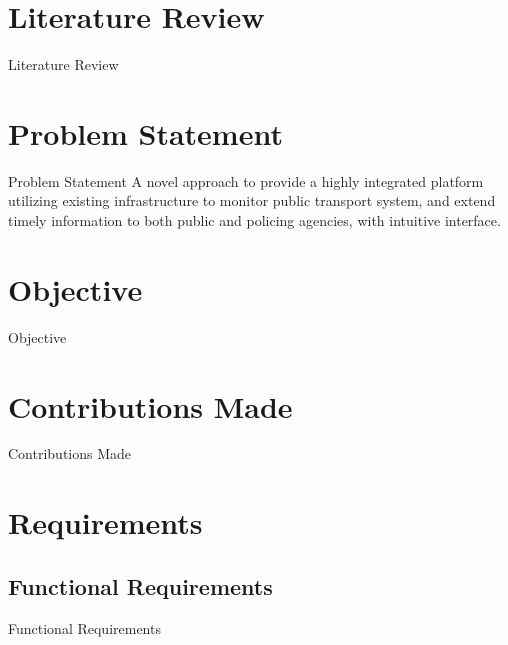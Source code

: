 \documentclass{beamer}
\begin{document}

\section{Literature Review}
\begin{frame}{Literature Review}
	
\end{frame}


\section{Problem Statement}
\begin{frame}{Problem Statement}
	A novel approach to provide a highly integrated platform utilizing existing infrastructure to monitor public transport system, and extend timely information to both public and policing agencies, with intuitive interface.
\end{frame}


\section{Objective}
\begin{frame}{Objective}
\end{frame}


\section{Contributions Made}
\begin{frame}{Contributions Made}
\end{frame}


\section{Requirements}
\subsection{Functional Requirements}
\begin{frame}{Functional Requirements}
\end{frame}
\end{document}
